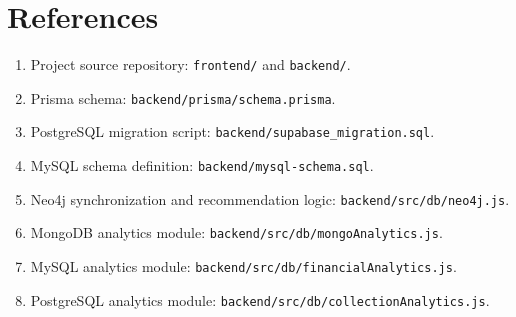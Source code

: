 \documentclass[12pt,a4paper]{report}
\begin{document}
\chapter*{References}
\begin{enumerate}[leftmargin=1.5em]
    \item Project source repository: \texttt{frontend/} and \texttt{backend/}.
    \item Prisma schema: \texttt{backend/prisma/schema.prisma}.
    \item PostgreSQL migration script: \texttt{backend/supabase\_migration.sql}.
    \item MySQL schema definition: \texttt{backend/mysql-schema.sql}.
    \item Neo4j synchronization and recommendation logic: \texttt{backend/src/db/neo4j.js}.
    \item MongoDB analytics module: \texttt{backend/src/db/mongoAnalytics.js}.
    \item MySQL analytics module: \texttt{backend/src/db/financialAnalytics.js}.
    \item PostgreSQL analytics module: \texttt{backend/src/db/collectionAnalytics.js}.
\end{enumerate}

\appendix
\end{document}
